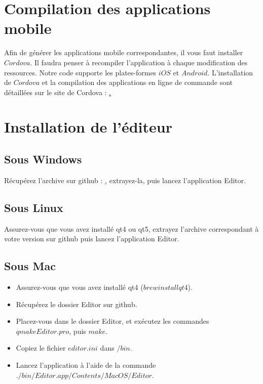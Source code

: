 \documentclass[11pt]{article}
\begin{document}
\section{Compilation des applications mobile}

Afin de générer les applications mobile correspondantes, il vous faut installer $Cordova$. Il faudra penser à recompiler l'application à chaque modification des ressources. Notre code supporte les plates-formes $iOS$ et $Android$. L'installation de $Cordova$ et la compilation des applications en ligne de commande sont détaillées sur le site de Cordova : \href{http://cordova.apache.org/docs/en/3.5.0/guide_cli_index.md.html#The%20Command-Line%20Interface}.

\section{Installation de l'éditeur}
\subsection{Sous Windows}
Récupérez l'archive sur github : \href{https://github.com/ProjetCristallo/Editor/releases}, extrayez-la, puis lancez l'application Editor.
\subsection{Sous Linux}
Assurez-vous que vous avez installé qt4 ou qt5, extrayez l'archive correspondant à votre version sur github puis lancez l'application Editor.
\subsection{Sous Mac}
\begin{itemize}
\item Assurez-vous que vous avez installé qt4 ($brew install qt4$).
\item Récupérez le dossier Editor sur github.
\item Placez-vous dans le dossier Editor, et exécutez les commandes $qmake Editor.pro$, puis $make$.
\item Copiez le fichier $editor.ini$ dans $/bin$.
\item Lancez l'application à l'aide de la commande $./bin/Editor.app/Contents/MacOS/Editor$.
\end{itemize}
\end{document}
